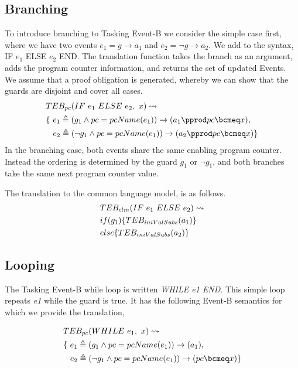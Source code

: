 \subsection{Branching}
To introduce branching to Tasking Event-B we consider the simple case first, where we have two events $e_1 = g \rightarrow a_1$ and $e_2 = \lnot g \rightarrow a_2$. We add to the syntax, IF $e_1$ ELSE $e_2$ END. The translation function takes the branch as an argument, adds the program counter information, and returns the set of updated Events. We assume that a proof obligation is generated, whereby we can show that the guards are disjoint and cover all cases.
%
\begin{equation}
\begin{split}
&TEB_{pc}(IF~ e_1~ ELSE~ e_2,~  x) \leadsto\\
& \{~ e_1 \triangleq (g_1 \land pc = pcName(e_1)) \rightarrow (a_1 \pprod pc \bcmeq x),\\
&\hspace*{0.3cm}e_2 \triangleq (\lnot g_1 \land pc = pcName(e_1)) \rightarrow (a_2 \pprod pc \bcmeq x) \}
\end{split}
\notag
\end{equation}
%
In the branching case, both events share the same enabling program counter. Instead the ordering is determined by the guard $g_1$ or $\lnot g_1$, and both branches take the same next program counter value. 

The translation to the common language model, is as follows.
\begin{equation}
\begin{split}
&TEB_{clm}(IF~ e_1~ ELSE~ e_2) \leadsto\\
& if(g_1)\{ TEB_{iniValSubs}(a_1) \} \\
& else\{TEB_{iniValSubs}(a_2) \}
\end{split}
\notag
\end{equation}

\subsection{Looping}
The Tasking Event-B while loop is written \emph{WHILE e1 END}. This simple loop repeats \emph{e1} while the guard is true. It has the following Event-B semantics for which we provide the translation,

\begin{equation}
\begin{split}
&TEB_{pc}(WHILE~ e_1,~  x) \leadsto\\
& \{~ e_1 \triangleq (g_1 \land pc = pcName(e_1)) \rightarrow (a_1 ),\\
&\hspace*{0.3cm}e_2 \triangleq (\lnot g_1 \land pc = pcName(e_1)) \rightarrow (pc \bcmeq x) \}
\end{split}
\notag
\end{equation}

